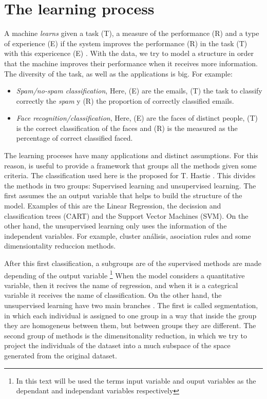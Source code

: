 \section{The learning process}

A machine \textit{learns} given a task (T), a measure of the performance (R) and a type of experience (E) if the system improves the performance (R) in the task (T) with this expericence (E) \cite{mitchell2006discipline}. With the data, we try to model a structure in order that the machine improves their performance when it receives more information. The diversity of the task, as well as the applications is big. For example:

\begin{itemize} 

\item \textit{Spam/no-spam classification}, Here, (E) are the emails, (T) the task to classify correctly the \textit{spam} y (R) the proportion of correctly classified emails.

\item \textit{Face recognition/classification}, Here, (E) are the faces of distinct people, (T) is the correct classification of the faces and (R) is the measured as the percentage of correct classified faced.

\end{itemize} 

The learning proceses have many applications and distinct assumptions. For this reason, is useful to provide a framework that groups all the methods given some criteria. The classification used here is the proposed for T. Hastie \cite{hastie2009elements}. This divides the methods in two groups: Supervised learning and unsupervised learning. The first assumes the an output variable that helps to build the structure of the model. Examples of this are the Linear Regression, the decission and classification trees (CART) and the Support Vector Machines (SVM). On the other hand, the unsupervised learning only uses the information of the independent variables. For example, cluster análisis, asociation rules and some dimensiontality reduccion methods.

After this first classification, a subgroups are of the supervised methods are made depending of the output variable \footnote{In this text will be used the terms input variable and ouput variables as the  dependant and independant variables respectively} When the model considers a quantitative variable, then it recives the name of regression, and when it is a categrical variable it receives the name of classification. On the other hand, the unsupervised learning have two main branches \cite{hastie2009elements}. The first is called segmentation, in which each individual is assigned to one group in a way that inside the group they are homogeneus between them, but between groups they are different. The second group of methods is the dimensitonality reduction, in which we try to project the individuals of the dataset into a much subspace of the space generated from the original dataset.

